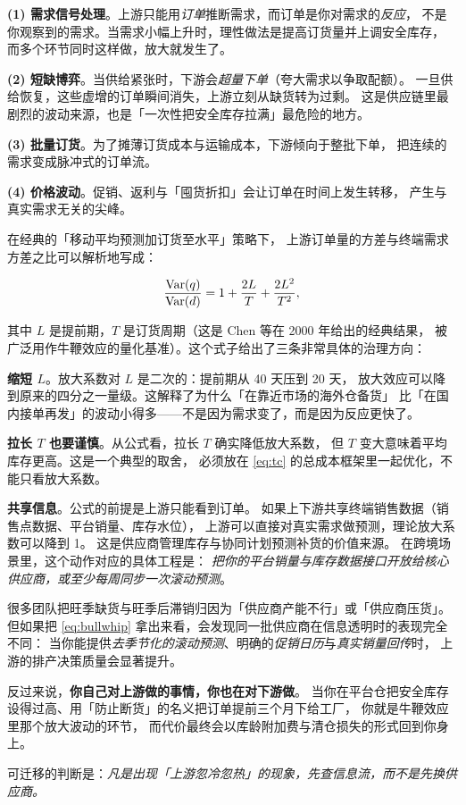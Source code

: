 \textbf{(1) 需求信号处理}。上游只能用\emph{订单}推断需求，而订单是你对需求的\emph{反应}，
不是你观察到的需求。当需求小幅上升时，理性做法是提高订货量并上调安全库存，
而多个环节同时这样做，放大就发生了。

\textbf{(2) 短缺博弈}。当供给紧张时，下游会\emph{超量下单}（夸大需求以争取配额）。
一旦供给恢复，这些虚增的订单瞬间消失，上游立刻从缺货转为过剩。
这是供应链里最剧烈的波动来源，也是「一次性把安全库存拉满」最危险的地方。

\textbf{(3) 批量订货}。为了摊薄订货成本与运输成本，下游倾向于整批下单，
把连续的需求变成脉冲式的订单流。

\textbf{(4) 价格波动}。促销、返利与「囤货折扣」会让订单在时间上发生转移，
产生与真实需求无关的尖峰。

在经典的「移动平均预测加订货至水平」策略下，
上游订单量的方差与终端需求方差之比可以解析地写成：

\begin{equation}
\frac{\operatorname{Var}(q)}{\operatorname{Var}(d)} = 1 + \frac{2L}{T} + \frac{2L^2}{T^2},
\label{eq:bullwhip}
\end{equation}

其中 $L$ 是提前期，$T$ 是订货周期（这是 Chen 等在 2000 年给出的经典结果，
被广泛用作牛鞭效应的量化基准）。这个式子给出了三条非常具体的治理方向：

\textbf{缩短 $L$}。放大系数对 $L$ 是二次的：提前期从 40 天压到 20 天，
放大效应可以降到原来的四分之一量级。这解释了为什么「在靠近市场的海外仓备货」
比「在国内接单再发」的波动小得多——不是因为需求变了，而是因为反应更快了。

\textbf{拉长 $T$ 也要谨慎}。从公式看，拉长 $T$ 确实降低放大系数，
但 $T$ 变大意味着平均库存更高。这是一个典型的取舍，
必须放在 \cref{eq:tc} 的总成本框架里一起优化，不能只看放大系数。

\textbf{共享信息}。公式的前提是上游只能看到订单。
如果上下游共享终端销售数据（销售点数据、平台销量、库存水位），
上游可以直接对真实需求做预测，理论放大系数可以降到 1。
这是供应商管理库存与协同计划预测补货的价值来源。
在跨境场景里，这个动作对应的具体工程是：
\emph{把你的平台销量与库存数据接口开放给核心供应商，或至少每周同步一次滚动预测}。

\begin{insight}
很多团队把旺季缺货与旺季后滞销归因为「供应商产能不行」或「供应商压货」。
但如果把 \cref{eq:bullwhip} 拿出来看，会发现同一批供应商在信息透明时的表现完全不同：
当你能提供\emph{去季节化的滚动预测}、明确的\emph{促销日历}与\emph{真实销量回传}时，
上游的排产决策质量会显著提升。

反过来说，\textbf{你自己对上游做的事情，你也在对下游做}。
当你在平台仓把安全库存设得过高、用「防止断货」的名义把订单提前三个月下给工厂，
你就是牛鞭效应里那个放大波动的环节，
而代价最终会以库龄附加费与清仓损失的形式回到你身上。

可迁移的判断是：\emph{凡是出现「上游忽冷忽热」的现象，先查信息流，而不是先换供应商。}
\end{insight}


